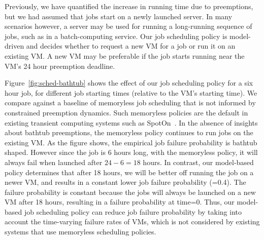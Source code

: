 Previously, we have quantified the increase in running time due to preemptions, but we had assumed that jobs start on a newly launched server.
In many scenarios however, a server may be used for running a long-running sequence of jobs, such as in a batch-computing service. 
%
Our job scheduling policy is model-driven and decides whether to request a new VM for a job or run it on an existing VM.
A new VM may be preferable if the job starts running near the VM's 24 hour preemption deadline.

Figure~\ref{fig:sched-bathtub} shows the effect of our job scheduling policy for a six hour job, for different job starting times (relative to the VM's starting time). 
We compare against a baseline of memoryless job scheduling that is not informed by constrained preemption dynamics.
Such memoryless policies are the default in existing transient computing systems such as SpotOn~\cite{spoton}. 
In the absence of insights about bathtub preemptions, the memoryless policy continues to run jobs on the existing VM. 
As the figure shows, the empirical job failure probability is bathtub shaped. 
However since the job is 6 hours long, with the memoryless policy, it will always fail when launched after $24-6=18$ hours.
In contrast, our model-based policy determines that after 18 hours, we will be better off running the job on a newer VM, and results in a constant lower job failure probability (=0.4). The failure probability is constant because the jobs will always be launched on a new VM after 18 hours, resulting in a failure probability at time=0. 
Thus, our model-based job scheduling policy can reduce job failure probability by taking into account the time-varying failure rates of VMs, which is not considered by existing systems that use memoryless scheduling policies. 

